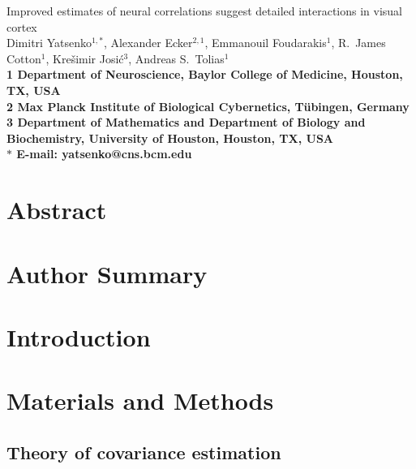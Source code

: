 \documentclass[10pt]{article}
\date{}
\begin{document}
\begin{flushleft}
{\Large
Improved estimates of neural correlations suggest detailed interactions in visual cortex
}
\\
Dimitri Yatsenko$^{1,\ast}$, 
Alexander Ecker$^{2,1}$,
Emmanouil Foudarakis$^{1}$,
R.~James Cotton$^{1}$,
Kre\v{s}imir Josi\'{c}$^{3}$,
Andreas S.~Tolias$^{1}$
\\
\bf{1} Department of Neuroscience, Baylor College of Medicine, Houston, TX, USA
\\
\bf{2} Max Planck Institute of Biological Cybernetics, T\"ubingen, Germany
\\
\bf{3} Department of Mathematics and Department of Biology and Biochemistry, University of Houston, Houston, TX, USA
\\
$\ast$ E-mail: yatsenko@cns.bcm.edu
\end{flushleft}

\section*{Abstract}


\section*{Author Summary}

\section*{Introduction}



\section*{Materials and Methods}
\subsection*{Theory of covariance estimation}



\end{document}
